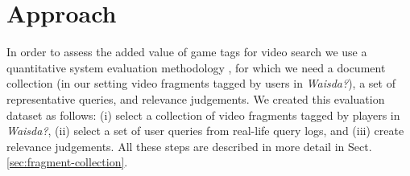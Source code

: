 \section{Approach}\label{ecir:sec:approach}
In order to assess the added value of game tags for video search we use a quantitative system evaluation methodology \cite{vorhees}, for which we need a document collection (in our setting video fragments tagged by users in \textit{Waisda?}), a set of representative queries, and relevance judgements.
We created this evaluation dataset as follows: (i) select a collection of video fragments tagged by players in \textit{Waisda?}, (ii) select a set of user queries from real-life query logs, and (iii) create relevance judgements. All these steps are described in more detail in Sect. \ref{sec:fragment-collection}.
